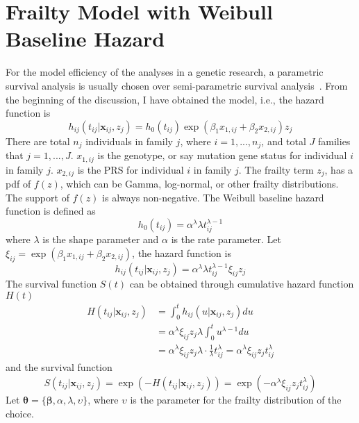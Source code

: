 \documentclass[preprint,12pt]{elsarticle}
\begin{document}
\section{Frailty Model with Weibull Baseline Hazard}
For the model efficiency of the analyses in a genetic research, a parametric survival analysis is usually chosen over semi-parametric survival analysis~\cite{rudolph2018parametric, berger2001statistical}.
From the beginning of the discussion, I have obtained the model, i.e., the hazard function is
\begin{equation}
    h_{ij}(t_{ij}|\mathbf{x}_{ij}, z_j)=h_0(t_{ij})\exp(\beta_1x_{1,ij}+\beta_2 x_{2,ij})z_j
\end{equation}
There are total $n_j$ individuals in family $j$, where $i=1,...,n_j$, and total $J$ families that $j=1,...,J$. $x_{1,ij}$ is the genotype, or say mutation gene status for individual $i$ in family $j$. $x_{2,ij}$
is the PRS for individual $i$ in family $j$. The frailty term $z_j$, has a pdf of $f(z)$, which can be Gamma, log-normal, or other frailty distributions.
The support of $f(z)$ is always non-negative. The Weibull baseline hazard function is defined as
\begin{equation}
    h_0(t_{ij})=\alpha^{\lambda}\lambda t_{ij}^{\lambda-1}
\end{equation}
where $\lambda$ is the shape parameter and $\alpha$ is the rate parameter. Let $\xi_{ij}=\exp(\beta_1 x_{1,ij}+\beta_2 x_{2,ij})$, the hazard function is 
\begin{equation}
    h_{ij}(t_{ij}|\mathbf{x}_{ij}, z_j)=\alpha^{\lambda}\lambda t_{ij}^{\lambda-1}\xi_{ij}z_j
\end{equation}
The survival function $S(t)$ can be obtained through cumulative hazard function $H(t)$
\begin{align}
    H(t_{ij}|\mathbf{x}_{ij}, z_j)&=\int_0^{t}h_{ij}(u|\mathbf{x}_{ij}, z_j)du\\
    &=\alpha^{\lambda}\xi_{ij}z_j\lambda\int_0^t u^{\lambda-1}du\\
    &=\alpha^{\lambda}\xi_{ij}z_j\lambda\cdot \frac{1}{\lambda} t_{ij}^{\lambda}=\alpha^{\lambda}\xi_{ij}z_j t_{ij}^{\lambda}
\end{align}
and the survival function
\begin{equation}
    S(t_{ij}|\mathbf{x}_{ij}, z_j)=\exp(-H(t_{ij}|\mathbf{x}_{ij}, z_j))=\exp(-\alpha^{\lambda}\xi_{ij}z_j t_{ij}^{\lambda})
\end{equation}
Let $\boldsymbol{\theta}=\{\boldsymbol{\beta}, \alpha, \lambda, \upsilon\}$, where $\upsilon$ is the parameter for the frailty distribution of the choice. 
\end{document}
